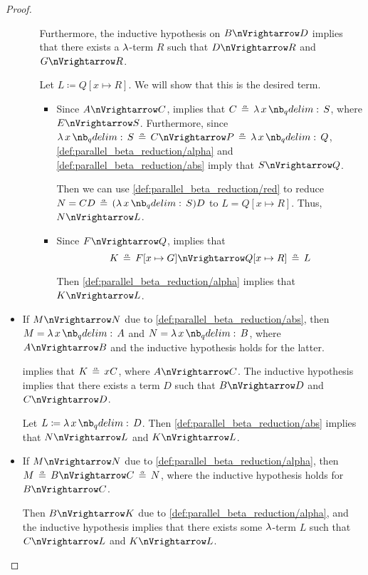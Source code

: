 \begin{proof}
\begin{itemize}
\begin{itemize}
      Furthermore, the inductive hypothesis on \( B \pred D \) implies that there exists a \( \mathrm{\lambda} \)-term \( R \) such that \( D \pred R \) and \( G \pred R \).

      Let \( L \coloneqq Q[x \mapsto R] \). We will show that this is the desired term.
      \begin{itemize}
        \item Since \( A \pred C \),  implies that \( C \aequiv \qabs x S \), where \( E \pred S \). Furthermore, since \( \qabs x S \aequiv C \pred P \aequiv \qabs x Q \), \ref{def:parallel_beta_reduction/alpha} and \ref{def:parallel_beta_reduction/abs} imply that \( S \pred Q \).

        Then we can use \ref{def:parallel_beta_reduction/red} to reduce \( N = CD \aequiv (\qabs x S) D \) to \( L = Q[x \mapsto R] \). Thus, \( N \pred L \).

        \item Since \( F \pred Q \),  implies that
        \begin{equation*}
          K \aequiv F[x \mapsto G] \pred Q[x \mapsto R] \aequiv L
        \end{equation*}

         Then \ref{def:parallel_beta_reduction/alpha} implies that \( K \pred L \).
      \end{itemize}
    \end{itemize}

    \item If \( M \pred N \) due to \ref{def:parallel_beta_reduction/abs}, then \( M = \qabs x A \) and \( N = \qabs x B \), where \( A \pred B \) and the inductive hypothesis holds for the latter.

     implies that \( K \aequiv x C \), where \( A \pred C \). The inductive hypothesis implies that there exists a term \( D \) such that \( B \pred D \) and \( C \pred D \).

    Let \( L \coloneqq \qabs x D \). Then \ref{def:parallel_beta_reduction/abs} implies that \( N \pred L \) and \( K \pred L \).

    \item If \( M \pred N \) due to \ref{def:parallel_beta_reduction/alpha}, then \( M \aequiv B \pred C \aequiv N \), where the inductive hypothesis holds for \( B \pred C \).

    Then \( B \pred K \) due to \ref{def:parallel_beta_reduction/alpha}, and the inductive hypothesis implies that there exists some \( \mathrm{\lambda} \)-term \( L \) such that \( C \pred L \) and \( K \pred L \).


\end{itemize}
\end{proof}
